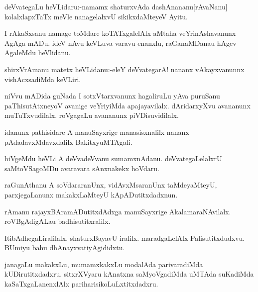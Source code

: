 \documentclass{article}
\begin{document}
\begin{mn}%
deVvategaLu heVLidaru:-namamx shaturxvAda dashAnananu[rAvaNanu] kolalxlapxTaTx meVle 
nanagelalxvU sikikxdaMteyeV Ayitu.
\end{mn}

\begin{mn}%
I rAkaSxsanu namage toMdare koTATxgalelAlx aMtaha veYrinAshavanunx AgAga mADu. ideV nAvu 
keVLuva varavu enanxlu, raGanaMDanau hAgev AgaleMdu heVlidanu.
\end{mn}

\begin{mn}%
shirxVrAmanu matetx heVLidanu:-eleY deVvategarA! nananx vAkayxvanunnx vishAcxsadiMda keVLiri.
\end{mn}

\begin{mn}%
niVvu mADida guNada I sotxVtarxvanunx hagaliruLu yAva puruSanu paThisutAtxneyoV avanige 
veYriyiMda apajayavilalx. dAridarxyXvu avananunx muTuTxvudilalx. roVgagaLu avananunx 
piVDisuvidilalx.
\end{mn}

\begin{mn}%
idanunx pathisidare A manuSayxrige manasisxnalilx nananx pAdadavxMdavxdalilx BakitxyuMTAgali.
\end{mn}

\begin{mn}%
hiVgeMdu heVLi A deVvadeVvanu sumamxnAdanu. deVvategaLelalxrU saMtoVSagoMDu avaravara 
sAnxnakekx hoVdaru.
\end{mn}

\begin{mn}%
raGunAthanu A soVdararanUnx, vidAvxMsaranUnx taMdeyaMteyU, parxjegaLanunx makakxLaMteyU 
kApADutitxdadxnun.
\end{mn}

\begin{mn}%
rAmanu rajayxBAramADutitxdAdxga manuSayxrige AkalamaraNAvilalx. roVBgAdigALau 
badhisutitxralilx.
\end{mn}

\begin{mn}%
ItibAdhegaLiralilalx. shaturxBayavU iralilx. maradgaLelAlx Palisutitxdudxvu. BUmiyu bahu 
dhAnayxvatiyAgididxtu.
\end{mn}

\begin{mn}%
janagaLu makakxLu, mumamxkakxLu modalAda parivaradiMda kUDirutitxdadxru. sitxrXVyaru 
kAnatxna saMyoVgadiMda uMTAda suKadiMda kaSaTxgaLanenxlAlx pariharisikoLuLxtitxdadxru.
\end{mn}
\end{document}
